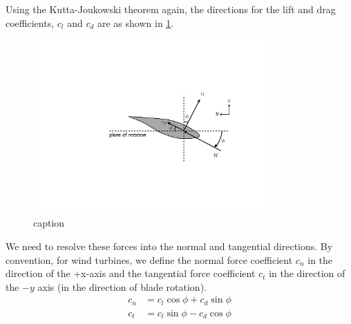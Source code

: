 \documentclass{article}
\begin{document}
Using the Kutta-Joukowski theorem again, the directions for the lift and drag coefficients, $c_l$ and $c_d$ are as shown in \cref{fig:inflow3}.
\begin{figure}[htbp]
\centering
\includegraphics[width=3.5in]{figures/inflow3}
\caption{caption}
\label{fig:inflow3}
\end{figure}
We need to resolve these forces into the normal and tangential directions.  By convention, for wind turbines, we define the normal force coefficient $c_n$ in the direction of the +x-axis and the tangential force coefficient $c_t$ in the direction of the $-y$ axis (in the direction of blade rotation).
\begin{equation}
    \begin{aligned}
        c_n &= c_l \cos\phi + c_d \sin\phi\\
        c_t &= c_l \sin\phi - c_d \cos\phi\\
    \end{aligned}
\end{equation}
\end{document}
